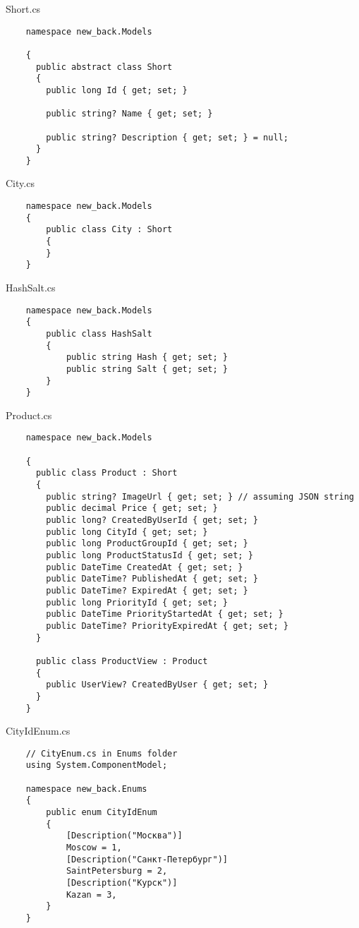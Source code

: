 Short.cs
\lstset{style=sharpc}
\begin{lstlisting}
    namespace new_back.Models

    {
      public abstract class Short
      {
        public long Id { get; set; }
    
        public string? Name { get; set; }
    
        public string? Description { get; set; } = null;
      }
    }
\end{lstlisting}

City.cs
\lstset{style=sharpc}
\begin{lstlisting}
    namespace new_back.Models
    {
        public class City : Short
        {
        }
    }
\end{lstlisting}

HashSalt.cs
\lstset{style=sharpc}
\begin{lstlisting}
    namespace new_back.Models
    {
        public class HashSalt
        {
            public string Hash { get; set; }
            public string Salt { get; set; }
        }
    }
\end{lstlisting}

Product.cs
\lstset{style=sharpc}
\begin{lstlisting}
    namespace new_back.Models

    {
      public class Product : Short
      {
        public string? ImageUrl { get; set; } // assuming JSON string
        public decimal Price { get; set; }
        public long? CreatedByUserId { get; set; }
        public long CityId { get; set; }
        public long ProductGroupId { get; set; }
        public long ProductStatusId { get; set; }
        public DateTime CreatedAt { get; set; }
        public DateTime? PublishedAt { get; set; }
        public DateTime? ExpiredAt { get; set; }
        public long PriorityId { get; set; }
        public DateTime PriorityStartedAt { get; set; }
        public DateTime? PriorityExpiredAt { get; set; }
      }
      
      public class ProductView : Product
      {
        public UserView? CreatedByUser { get; set; }
      }
    }
\end{lstlisting}

CityIdEnum.cs
\lstset{style=sharpc}
\begin{lstlisting}
    // CityEnum.cs in Enums folder
    using System.ComponentModel;
    
    namespace new_back.Enums
    {
        public enum CityIdEnum
        {
            [Description("Москва")]
            Moscow = 1,
            [Description("Санкт-Петербург")]
            SaintPetersburg = 2,
            [Description("Курск")]
            Kazan = 3,
        }
    }    
\end{lstlisting}

